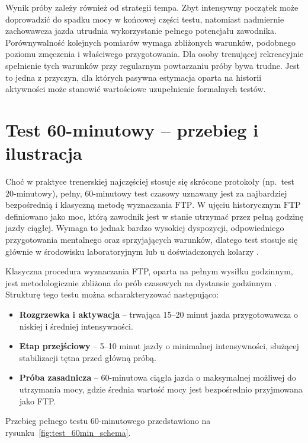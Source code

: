 Wynik próby zależy również od strategii tempa. Zbyt intensywny początek może doprowadzić do spadku mocy w końcowej części testu, natomiast nadmiernie zachowawcza jazda utrudnia wykorzystanie pełnego potencjału zawodnika. Porównywalność kolejnych pomiarów wymaga zbliżonych warunków, podobnego poziomu zmęczenia i właściwego przygotowania. Dla osoby trenującej rekreacyjnie spełnienie tych warunków przy regularnym powtarzaniu próby bywa trudne. Jest to jedna z przyczyn, dla których pasywna estymacja oparta na historii aktywności może stanowić wartościowe uzupełnienie formalnych testów.

\FloatBarrier
\section{Test 60-minutowy -- przebieg i ilustracja}

Choć w praktyce trenerskiej najczęściej stosuje się skrócone protokoły (np.\ test $20$-minutowy), pełny, $60$-minutowy test czasowy uznawany jest za najbardziej bezpośrednią i klasyczną metodę wyznaczania $\mathrm{FTP}$.
W ujęciu historycznym $\mathrm{FTP}$ definiowano jako moc, którą zawodnik jest w stanie utrzymać przez pełną godzinę jazdy ciągłej.
Wymaga to jednak bardzo wysokiej dyspozycji, odpowiedniego przygotowania mentalnego oraz sprzyjających warunków, dlatego test stosuje się głównie w środowisku laboratoryjnym lub u doświadczonych kolarzy \parencite{allen2019power,sitko2023_ac20to60_update}.

Klasyczna procedura wyznaczania FTP, oparta na pełnym wysiłku godzinnym, jest metodologicznie zbliżona do prób czasowych na dystansie godzinnym \parencite{allen2019power}. Strukturę tego testu można scharakteryzować następująco:
\begin{itemize}
  \item \textbf{Rozgrzewka i aktywacja} -- trwająca 15--20 minut jazda przygotowawcza o niskiej i średniej intensywności.
  \item \textbf{Etap przejściowy} -- 5--10 minut jazdy o minimalnej intensywności, służącej stabilizacji tętna przed główną próbą.
  \item \textbf{Próba zasadnicza} -- 60-minutowa ciągła jazda o maksymalnej możliwej do utrzymania mocy, gdzie średnia wartość mocy jest bezpośrednio przyjmowana jako FTP.
\end{itemize}

Przebieg pełnego testu $60$-minutowego przedstawiono na rysunku~\ref{fig:test_60min_schema}.

